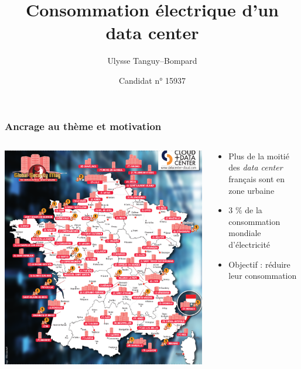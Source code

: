 \documentclass[a4paper,11pt]{beamer}
\title{Consommation électrique d'un data center}
\author{Ulysse Tanguy--Bompard}
\date{Candidat n° 15937}
\begin{document}

\maketitle %


\begin{frame}
    \frametitle{Ancrage au thème et motivation}

    \begin{columns}
        \begin{column}{0.5\textwidth}
            \includegraphics[width=\textwidth]{carte_data_center.png}
        \end{column}
        \begin{column}{0.5\textwidth}
            \begin{itemize}
                \item Plus de la moitié des \textit{data center} français sont en zone urbaine
                \item 3 \% de la consommation mondiale d'électricité
                \item Objectif : réduire leur consommation
            \end{itemize}
        \end{column}
    \end{columns}
\end{frame}
\end{document}
